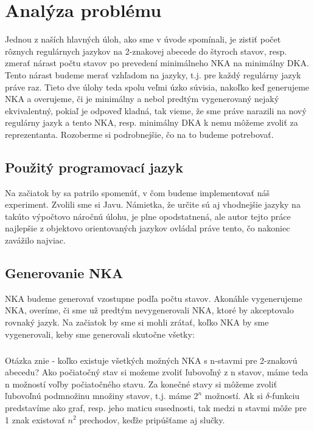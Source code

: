 \chapter{Analýza problému}
Jednou z naších hlavných úloh, ako sme v úvode spomínali, je zistiť počet rôznych regulárnych jazykov na 2-znakovej abecede do štyroch stavov, resp. zmerať nárast počtu stavov po prevedení minimálneho NKA na minimálny DKA. Tento nárast budeme merať vzhľadom na jazyky, t.j. pre každý regulárny jazyk práve raz. Tieto dve úlohy teda spolu veľmi úzko súvisia, nakoľko keď generujeme NKA a overujeme, či je minimálny a nebol predtým vygenerovaný nejaký ekvivalentný, pokiaľ je odpoveď kladná, tak vieme, že sme práve narazili na nový regulárny jazyk a tento NKA, resp. minimálny DKA k nemu môžeme zvoliť za reprezentanta. Rozoberme si podrobnejšie, čo na to budeme potrebovať.


\section{Použitý programovací jazyk}
Na začiatok by sa patrilo spomenúť, v čom budeme implementovať náš experiment. Zvolili sme si Javu. Námietka, že určite sú aj vhodnejšie jazyky na takúto výpočtovo náročnú úlohu, je plne opodstatnená, ale autor tejto práce najlepšie z objektovo orientovaných jazykov ovládal práve tento, čo nakoniec zavážilo najviac.

\section{Generovanie NKA}
NKA budeme generovať vzostupne podľa počtu stavov. Akonáhle vygenerujeme NKA, overíme, či sme už predtým nevygenerovali NKA, ktoré by akceptovalo rovnaký jazyk. Na začiatok by sme si mohli zrátať, koľko NKA by sme vygenerovali, keby sme generovali skutočne všetky:

\paragraph{}
Otázka znie - koľko existuje všetkých možných NKA s n-stavmi pre 2-znakovú abecedu? Ako počiatočný stav si možeme zvoliť ľubovoľný z n stavov, máme teda n možností voľby počiatočného stavu. Za konečné stavy si môžeme zvoliť ľubovoľnú podmnožinu množiny stavov, t.j. máme $2^n$ možností. Ak si $\delta$-funkciu predstavíme ako graf, resp. jeho maticu susednosti, tak medzi n stavmi môže pre 1 znak existovať $n^2$ prechodov, keďže pripúšťame aj slučky.


